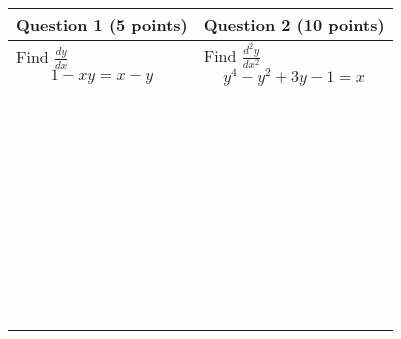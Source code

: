 \documentclass[11pt,letterpaper]{exam}
\begin{document}
\begin{tabularx}{\textwidth}{X|X}
  \textbf{Question 1} (5 points) & \textbf{Question 2} (10 points) \\
\hline
Find $\displaystyle\frac{dy}{dx}$
$$
1-xy=x-y
$$

\vfill
&

Find $\displaystyle\frac{d^2y}{dx^2}$
$$
y^4 -y^2 + 3y -1 = x
$$

\\
\\
\\
\\
\\
\\
\\
\\
\\
\\
\\
\\
\\
\\
\\
\\
\\
\\
\\
\\
\\
\\
\\
\\
\\
\\
\\
\\
\\
\\
\\
\\
\\
\\
\\
\\
\\
\\
\\
\\
\\




\end{tabularx}


\end{document}
